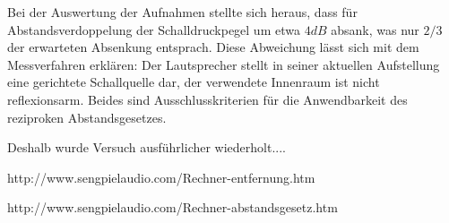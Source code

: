 Bei der Auswertung der Aufnahmen stellte sich heraus, dass für Abstandsverdoppelung der Schalldruckpegel um etwa \(4 dB\) absank, was nur \(2/3\) der erwarteten Absenkung entsprach. Diese Abweichung lässt sich mit dem Messverfahren erklären: Der Lautsprecher stellt in seiner aktuellen Aufstellung eine gerichtete Schallquelle dar, der verwendete Innenraum ist nicht reflexionsarm. Beides sind Ausschlusskriterien für die Anwendbarkeit des reziproken Abstandsgesetzes.



Deshalb wurde Versuch ausführlicher wiederholt....

http://www.sengpielaudio.com/Rechner-entfernung.htm

http://www.sengpielaudio.com/Rechner-abstandsgesetz.htm